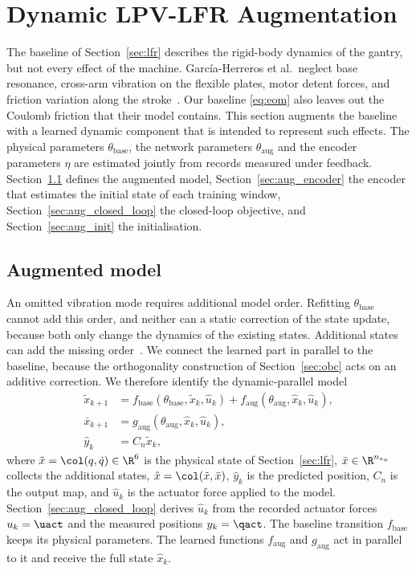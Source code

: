 \section{Dynamic LPV-LFR Augmentation}\label{sec:augmentation}

The baseline of Section~\ref{sec:lfr} describes the rigid-body dynamics of
the gantry, but not every effect of the machine.
Garc\'ia-Herreros et al.\ neglect base resonance, cross-arm vibration on
the flexible plates, motor detent forces, and friction variation along the
stroke~\cite[Sec.~2.4]{garcia2013model}.
Our baseline \eqref{eq:eom} also leaves out the Coulomb friction that their
model contains.
This section augments the baseline with a learned dynamic component that is
intended to represent such effects.
The physical parameters $\theta_{\mathrm{base}}$, the network parameters
$\theta_{\mathrm{aug}}$ and the encoder parameters $\eta$ are estimated
jointly from records measured under feedback.
Section~\ref{sec:aug_structure} defines the augmented model,
Section~\ref{sec:aug_encoder} the encoder that estimates the initial state of
each training window, Section~\ref{sec:aug_closed_loop} the closed-loop
objective, and Section~\ref{sec:aug_init} the initialisation.

\subsection{Augmented model}\label{sec:aug_structure}
An omitted vibration mode requires additional model order.
Refitting $\theta_{\mathrm{base}}$ cannot add this order, and neither can a
static correction of the state update, because both only change the dynamics
of the existing states.
Additional states can add the missing order~\cite[Sec.~2]{hoekstra2025lfr}.
We connect the learned part in parallel to the baseline, because the
orthogonality construction of Section~\ref{sec:obc} acts on an additive
correction.
We therefore identify the dynamic-parallel
model~\cite[Table~1]{hoekstra2026lfr}
\begin{equation}
\begin{aligned}
 \tilde x_{k+1}
 &=f_{\mathrm{base}}(\theta_{\mathrm{base}},\tilde x_k,\hat u_k)
   +f_{\mathrm{aug}}(\theta_{\mathrm{aug}},\hat x_k,\hat u_k),\\
 \bar x_{k+1}
 &=g_{\mathrm{aug}}(\theta_{\mathrm{aug}},\hat x_k,\hat u_k),\\
 \hat y_k&=C_n\tilde x_k ,
\end{aligned}
\label{eq:aug_transition}
\end{equation}
where $\tilde x=\col(q,\dot q)\in\R^6$ is the physical state of
Section~\ref{sec:lfr}, $\bar x\in\R^{n_{x_a}}$ collects the additional
states, $\hat x=\col(\tilde x,\bar x)$, $\hat y_k$ is the predicted
position, $C_n$ is the output map, and $\hat u_k$ is the actuator force
applied to the model.
Section~\ref{sec:aug_closed_loop} derives $\hat u_k$ from the recorded
actuator forces $u_k=\uact$ and the measured positions $y_k=\qact$.
The baseline transition $f_{\mathrm{base}}$ keeps its physical parameters.
The learned functions $f_{\mathrm{aug}}$ and $g_{\mathrm{aug}}$ act in
parallel to it and receive the full state $\hat x_k$.

